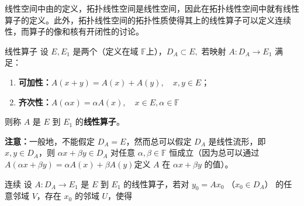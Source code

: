 
线性空间中由的定义，拓扑线性空间是线性空间，因此在拓扑线性空间中就有线性算子的定义。此外，拓扑线性空间的拓扑性质使得其上的线性算子可以定义连续性，而算子的像和核有开闭性的讨论。

\begin{definition}{线性算子}
设 $E,E_1$ 是两个（定义在域 $\mathbb F$上），$D_A\subset E,$ 若映射 $A:D_A\rightarrow E_1$ 满足：
\begin{enumerate}
\item \textbf{可加性：}$A(x+y)=A(x)+A(y),\quad x,y\in E$；
\item \textbf{齐次性：}$A(\alpha x)=\alpha A(x),\quad x\in E,\alpha\in \mathbb F$
\end{enumerate}
则称 $A$ 是 $E$ 到 $E_1$ 的\textbf{线性算子}。
  
\end{definition}

\textbf{注意：}一般地，不能假定 $D_A=E$，然而总可以假定 $D_A$ 是线性流形，即 $x,y\in D_A$，则 $\alpha x+\beta y\in D_A$ 对任意 $\alpha,\beta\in\mathbb F$ 恒成立（因为总可以通过 $A(\alpha x+\beta y)=\alpha A(x)+\beta A(y)$定义 $A$ 在 $\alpha x+\beta y$ 的值）。

\begin{definition}{连续}
设 $A:D_A\rightarrow E_1$ 是 $E$ 到 $E_1$ 的线性算子，若对 $y_0=Ax_0$ （$x_0\in D_A$） 的任意邻域 $V$，存在 $x_0$ 的邻域 $U$，使得 $$
\end{definition}

